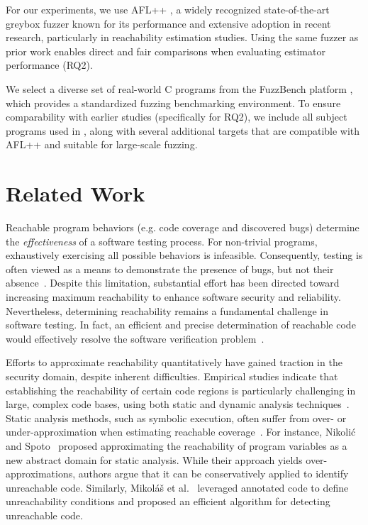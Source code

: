 \documentclass[conference]{IEEEtran}
\begin{document}
For our experiments, we use AFL++ \cite{fioraldi2020AFL++}, a widely recognized state-of-the-art greybox fuzzer known for its performance and extensive adoption in recent research, particularly in reachability estimation studies. Using the same fuzzer as prior work enables direct and fair comparisons when evaluating estimator performance (RQ2).

We select a diverse set of real-world C programs from the FuzzBench platform \cite{metzman2021fuzzbench}, which provides a standardized fuzzing benchmarking environment. To ensure comparability with earlier studies (specifically for RQ2), we include all subject programs used in \cite{liyanage2023reachable}, along with several additional targets that are compatible with AFL++ and suitable for large-scale fuzzing.


\section{Related Work}
\label{sec:related}

Reachable program behaviors (e.g. code coverage and discovered bugs) determine the \emph{effectiveness} of a software testing process. For non-trivial programs, exhaustively exercising all possible behaviors is infeasible. Consequently, testing is often viewed as a means to demonstrate the presence of bugs, but not their absence~\cite{dijkstra2022reliability}. Despite this limitation, substantial effort has been directed toward increasing maximum reachability to enhance software security and reliability. Nevertheless, determining reachability remains a fundamental challenge in software testing. In fact, an efficient and precise determination of reachable code would effectively resolve the software verification problem~\cite{liyanage2023reachable}. 

Efforts to approximate reachability quantitatively have gained traction in the security domain, despite inherent difficulties. Empirical studies indicate that establishing the reachability of certain code regions is particularly challenging in large, complex code bases, using both static and dynamic analysis techniques~\cite{latoza2010developers}. Static analysis methods, such as symbolic execution, often suffer from over- or under-approximation when estimating reachable coverage~\cite{liyanage2023reachable,aniche2015why}. For instance, Nikoli\'{c} and Spoto~\cite{nikolic2013reachability} proposed approximating the reachability of program variables as a new abstract domain for static analysis. While their approach yields over-approximations, authors argue that it can be conservatively applied to identify unreachable code. Similarly, Mikol\'{a}\v{s} et al.~\cite{janota2007reachability} leveraged annotated code to define unreachability conditions and proposed an efficient algorithm for detecting unreachable code.
\end{document}
